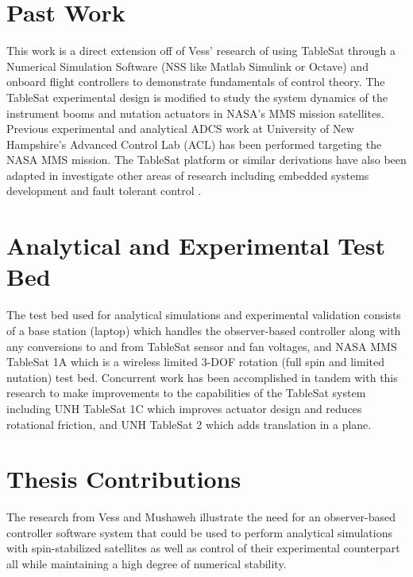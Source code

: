 \section{Past Work}
\label{sec:PastWork}

This work is a direct extension off of Vess' research \cite{vessthesis} of using TableSat through a Numerical Simulation Software (NSS like Matlab Simulink or Octave) and onboard flight controllers to demonstrate fundamentals of control theory.  The TableSat experimental design is modified to study the system dynamics of the instrument booms and nutation actuators in NASA's MMS mission satellites.  Previous experimental \cite{tsat1b} \cite{tsat1c} \cite{tsat2} and analytical \cite{mushawehthesis} ADCS work at University of New Hampshire's Advanced Control Lab (ACL) has been performed targeting the NASA MMS mission.  The TableSat platform or similar derivations have also been adapted in investigate other areas of research including embedded systems development \cite{tablesat_xuml} and fault tolerant control \cite{tablesat_object_bench} \cite{nanjing_university}.


\section{Analytical and Experimental Test Bed}
\label{sec:AnalyticalandExperimentalTestbed}

The test bed used for analytical simulations and experimental validation consists of a base station (laptop) which handles the observer-based controller along with any conversions to and from TableSat sensor and fan voltages, and NASA MMS TableSat 1A which is a wireless limited 3-DOF rotation (full spin and limited nutation) test bed.  Concurrent work has been accomplished in tandem with this research to make improvements to the capabilities of the TableSat system including UNH TableSat 1C \cite{tsat1c} which improves actuator design and reduces rotational friction, and UNH TableSat 2 \cite{tsat2} which adds translation in a plane.

\section{Thesis Contributions}
\label{sec:ThesisContributions}

The research from Vess and Mushaweh illustrate the need for an observer-based controller software system that could be used to perform analytical simulations with spin-stabilized satellites as well as control of their experimental counterpart all while maintaining a high degree of numerical stability.

